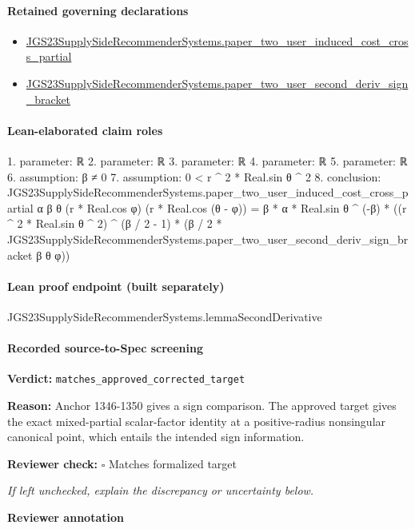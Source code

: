 \documentclass[10pt]{article}
\newcommand{\reviewerbox}{%
  \par\noindent\fbox{\parbox{0.96\linewidth}{\rule{0pt}{0.38in}}}\par
}
\newcommand{\reviewmatch}[1]{%
  \par\noindent\textbf{Reviewer check:} $\square$\; #1\par
  \noindent\emph{If left unchecked, explain the discrepancy or uncertainty below.}\par
}
\begin{document}
\paragraph{Retained governing declarations}
\begin{itemize}\raggedright
\item \hyperlink{governing-declaration-f149f020fbfde1e9}{JGS23\allowbreak{}Supply\allowbreak{}Side\allowbreak{}Recommender\allowbreak{}Systems.\allowbreak{}paper\_\allowbreak{}two\_\allowbreak{}user\_\allowbreak{}induced\_\allowbreak{}cost\_\allowbreak{}cross\_\allowbreak{}partial}
\item \hyperlink{governing-declaration-05e1b2c554446bd9}{JGS23\allowbreak{}Supply\allowbreak{}Side\allowbreak{}Recommender\allowbreak{}Systems.\allowbreak{}paper\_\allowbreak{}two\_\allowbreak{}user\_\allowbreak{}second\_\allowbreak{}deriv\_\allowbreak{}sign\_\allowbreak{}bracket}
\end{itemize}
\paragraph{Lean-elaborated claim roles}\begin{ReviewVerbatim}
1. parameter: ℝ
2. parameter: ℝ
3. parameter: ℝ
4. parameter: ℝ
5. parameter: ℝ
6. assumption: β ≠ 0
7. assumption: 0 < r ^ 2 * Real.sin θ ^ 2
8. conclusion: JGS23SupplySideRecommenderSystems.paper_two_user_induced_cost_cross_partial α β θ (r * Real.cos φ)
    (r * Real.cos (θ - φ)) =
  β * α * Real.sin θ ^ (-β) *
    ((r ^ 2 * Real.sin θ ^ 2) ^ (β / 2 - 1) *
      (β / 2 * JGS23SupplySideRecommenderSystems.paper_two_user_second_deriv_sign_bracket β θ φ))
\end{ReviewVerbatim}

\paragraph{Lean proof endpoint (built separately)}\begin{ReviewVerbatim}
JGS23SupplySideRecommenderSystems.lemmaSecondDerivative
\end{ReviewVerbatim}

\paragraph{Recorded source-to-Spec screening}
\textbf{Verdict:} \texttt{matches\_approved\_corrected\_target}
\\
{\raggedright
\textbf{Reason:} Anchor 1346-\allowbreak{}1350 gives a sign comparison.\allowbreak{}  The approved target gives the exact mixed-\allowbreak{}partial scalar-\allowbreak{}factor identity at a positive-\allowbreak{}radius nonsingular canonical point, which entails the intended sign information.\allowbreak{}
\par}
\reviewmatch{Matches formalized target}
\noindent\textbf{Reviewer annotation}\par
\reviewerbox
\clearpage
\hypertarget{source-claim-36be16943b79288f}{}
\end{document}
